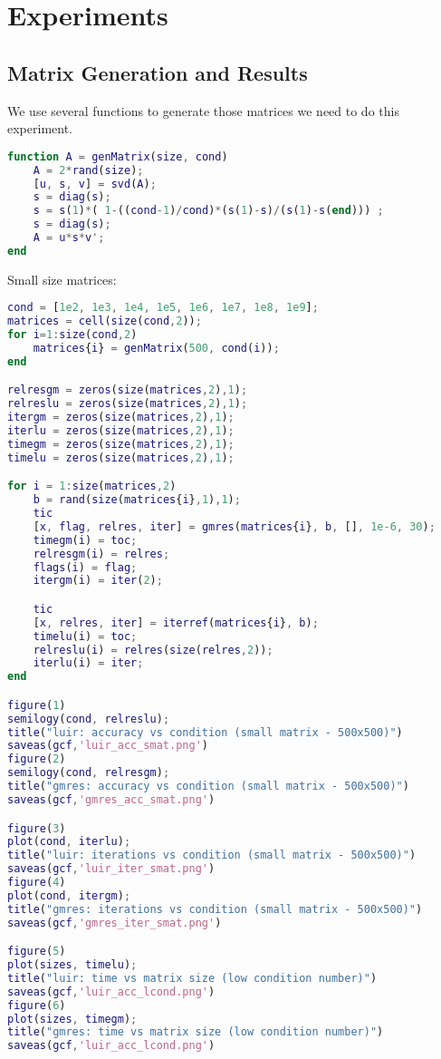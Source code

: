 \section{Experiments}

\subsection{Matrix Generation and Results}
We use several functions to generate those matrices we need to do this experiment.
\begin{lstlisting}[language=Matlab, caption=generating matrices with the specified condition number]
function A = genMatrix(size, cond)
    A = 2*rand(size);
    [u, s, v] = svd(A);
    s = diag(s);
    s = s(1)*( 1-((cond-1)/cond)*(s(1)-s)/(s(1)-s(end))) ;
    s = diag(s);
    A = u*s*v';
end
\end{lstlisting}
Small size matrices:
\begin{lstlisting}[language=Matlab, caption=Small size mtrix]
    cond = [1e2, 1e3, 1e4, 1e5, 1e6, 1e7, 1e8, 1e9];
matrices = cell(size(cond,2));
for i=1:size(cond,2)
    matrices{i} = genMatrix(500, cond(i));
end

relresgm = zeros(size(matrices,2),1);
relreslu = zeros(size(matrices,2),1);
itergm = zeros(size(matrices,2),1);
iterlu = zeros(size(matrices,2),1);
timegm = zeros(size(matrices,2),1);
timelu = zeros(size(matrices,2),1);

for i = 1:size(matrices,2)
    b = rand(size(matrices{i},1),1);
    tic
    [x, flag, relres, iter] = gmres(matrices{i}, b, [], 1e-6, 30);
    timegm(i) = toc;
    relresgm(i) = relres;
    flags(i) = flag;
    itergm(i) = iter(2);

    tic
    [x, relres, iter] = iterref(matrices{i}, b);
    timelu(i) = toc;
    relreslu(i) = relres(size(relres,2));
    iterlu(i) = iter;
end

figure(1)
semilogy(cond, relreslu);
title("luir: accuracy vs condition (small matrix - 500x500)")
saveas(gcf,'luir_acc_smat.png')
figure(2)
semilogy(cond, relresgm);
title("gmres: accuracy vs condition (small matrix - 500x500)")
saveas(gcf,'gmres_acc_smat.png')

figure(3)
plot(cond, iterlu);
title("luir: iterations vs condition (small matrix - 500x500)")
saveas(gcf,'luir_iter_smat.png')
figure(4)
plot(cond, itergm);
title("gmres: iterations vs condition (small matrix - 500x500)")
saveas(gcf,'gmres_iter_smat.png')

figure(5)
plot(sizes, timelu);
title("luir: time vs matrix size (low condition number)")
saveas(gcf,'luir_acc_lcond.png')
figure(6)
plot(sizes, timegm);
title("gmres: time vs matrix size (low condition number)")
saveas(gcf,'luir_acc_lcond.png')

\end{lstlisting}  
